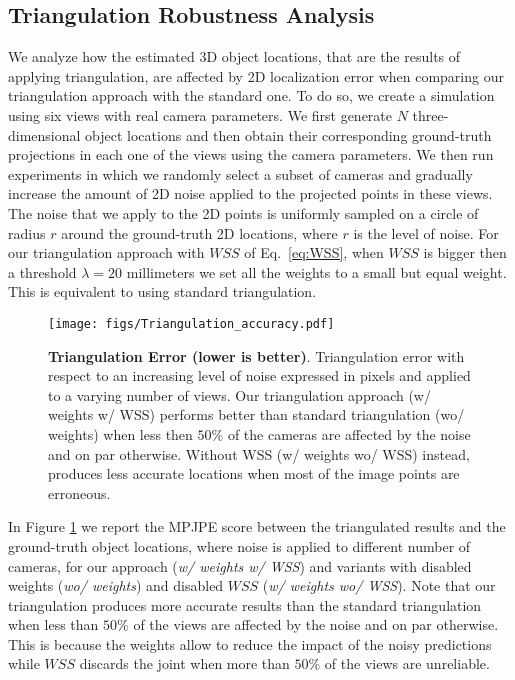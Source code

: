 \documentclass[runningheads]{llncs}
\begin{document}
\subsection*{Triangulation Robustness Analysis}
\label{sec:triangle_robustness}
We analyze how the estimated 3D object locations, that are the results of applying triangulation, are affected by 2D localization error when comparing our triangulation approach with the standard one. To do so, we create a simulation using six views with real camera parameters. We first generate $N$ three-dimensional object locations and then obtain their corresponding ground-truth projections in each one of the views using the camera parameters. We then run experiments in which we randomly select a subset of cameras and gradually increase the amount of 2D noise applied to the projected points in these views. The noise that we apply to the 2D points is uniformly sampled on a circle of radius $r$ around the ground-truth 2D locations, where $r$ is the level of noise. For our triangulation approach with $WSS$ of Eq.~\ref{eq:WSS}, when $WSS$ is bigger then a threshold $\lambda=20$ millimeters we set all the weights to a small but equal weight. This is equivalent to using standard triangulation.
\begin{figure}[ht]
	\centering
\texttt{[image: figs/Triangulation\_accuracy.pdf]}
	\caption{\small\textbf{Triangulation Error (lower is better)}. Triangulation error with respect to an increasing level of noise expressed in pixels and applied to a varying number of views. Our triangulation approach (w/ weights w/ WSS) performs better than standard triangulation (wo/ weights) when less then $50\%$ of the cameras are affected by the noise and on par otherwise. Without WSS (w/ weights wo/ WSS) instead, produces less accurate locations when most of the image points are erroneous.}
	\label{fig:triang_accuracy}
\end{figure}
In Figure \ref{fig:triang_accuracy} we report the MPJPE score between the triangulated results and the ground-truth object locations, where noise is applied to different number of cameras, for our approach ({\it w/ weights w/ WSS}) and variants with disabled weights ({\it wo/ weights}) and disabled $WSS$ ({\it w/ weights wo/ WSS}). Note that our triangulation produces more accurate results than the standard triangulation when less than $50 \%$ of the views are affected by the noise and on par otherwise. This is because the weights allow to reduce the impact of the noisy predictions while $WSS$ discards the joint when more than $50 \%$ of the views are unreliable.
  
\end{document}
